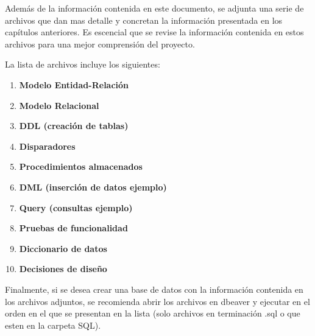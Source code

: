     Además de la información contenida en este documento, se adjunta una serie de archivos que dan mas detalle y concretan la información presentada en los capítulos anteriores. Es escencial que se revise la información contenida en estos archivos para una mejor comprensión del proyecto. \vspace{1cm}

    La lista de archivos incluye los siguientes: 

    \begin{enumerate}
        \item \textbf{Modelo Entidad-Relación} 
        \item \textbf{Modelo Relacional}
        \item \textbf{DDL (creación de tablas)}
        \item \textbf{Disparadores}
        \item \textbf{Procedimientos almacenados}
        \item \textbf{DML (inserción de datos ejemplo)}
        \item \textbf{Query (consultas ejemplo)}
        \item \textbf{Pruebas de funcionalidad}
        \item \textbf{Diccionario de datos}
        \item \textbf{Decisiones de diseño}
    \end{enumerate}

    \vspace{1cm}

    Finalmente, si se desea crear una base de datos con la información contenida en los archivos adjuntos, se recomienda abrir los archivos en dbeaver y ejecutar en el orden en el que se presentan en la lista (solo archivos en terminación .sql o que esten en la carpeta SQL).
